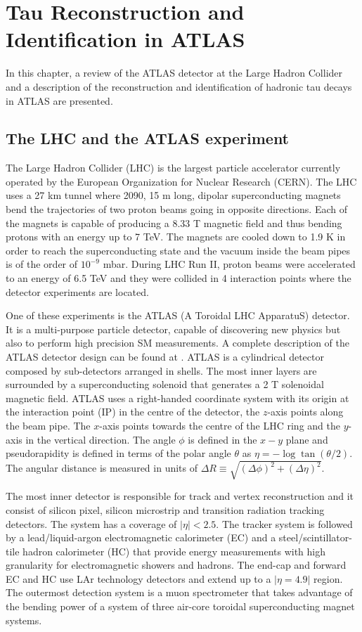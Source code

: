\chapter{Tau Reconstruction and Identification in ATLAS}\label{ATLAS}
In this chapter, a review of the ATLAS detector at the Large Hadron Collider and a description of the reconstruction and identification of hadronic tau decays in ATLAS are presented.
\section{The LHC and the ATLAS experiment}
The Large Hadron Collider (LHC) is the largest particle accelerator currently operated by the European Organization for Nuclear Research (CERN). The LHC uses a 27 km tunnel where 2090, 15 m long, dipolar superconducting magnets bend the trajectories of two proton beams going in opposite directions. Each of the magnets is capable of producing a 8.33 T magnetic field and thus bending protons with an energy up to 7 TeV. The magnets are cooled down to 1.9 K in order to reach the superconducting state and the vacuum inside the beam pipes is of the order of $10^{-9}$ mbar. During LHC Run II, proton beams were accelerated to an energy of 6.5 TeV and they were collided in 4 interaction points where the detector experiments are located.

One of these experiments is the ATLAS (A Toroidal LHC ApparatuS) detector. It is a multi-purpose particle detector, capable of discovering new physics but also to perform high precision SM measurements. A complete description of the ATLAS detector design can be found at \cite{ATLAS:1999uwa}. ATLAS is a cylindrical detector composed by sub-detectors arranged in shells. The most inner layers are surrounded by a superconducting solenoid that generates a 2 T solenoidal magnetic field. ATLAS uses a right-handed coordinate system with its origin at the interaction point (IP) in the centre of the detector, the $z$-axis points along the beam pipe. The $x$-axis points towards the centre of the LHC ring and the $y$-axis in the vertical direction. The angle $\phi$ is defined in the $x-y$ plane and pseudorapidity is defined in terms of the polar angle $\theta$ as $\eta=-\log \tan(\theta/2)$. The angular distance is measured in units of $\Delta R\equiv \sqrt{(\Delta\phi)^2+(\Delta\eta)^2}$.

The most inner detector is responsible for track and vertex reconstruction and it consist of silicon pixel, silicon microstrip and transition radiation tracking detectors. The system has a coverage of $|\eta|<2.5$. The tracker system is followed by a lead/liquid-argon electromagnetic calorimeter (EC) and a steel/scintillator-tile hadron calorimeter (HC) that provide energy measurements with high granularity for electromagnetic showers and hadrons. The end-cap and forward EC and HC use LAr technology detectors and extend up to a $|\eta=4.9|$ region. The outermost detection system is a muon spectrometer that takes advantage of the bending power of a system of three air-core toroidal superconducting magnet systems.
  
